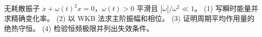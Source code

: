 无耗散振子 $\ddot x+\omega(t)^2x=0$，$\omega(t)>0$ 平滑且 $|\dot\omega|/\omega^2\ll1$。
(1) 写瞬时能量并求精确变化率。
(2) 以 WKB 法求主阶振幅和相位。
(3) 证明周期平均作用量的绝热守恒。
(4) 检验恒频极限并列出失效条件。
